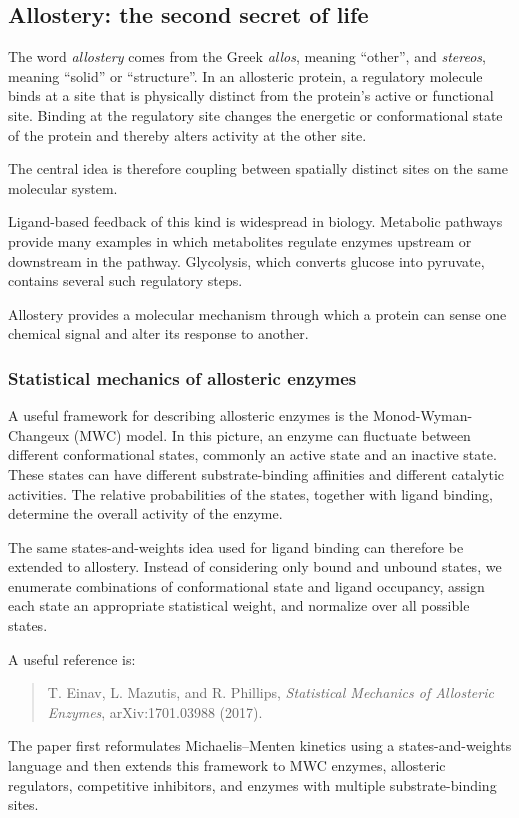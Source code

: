 \subsection{Allostery: the second secret of life}

The word \emph{allostery} comes from the Greek \emph{allos}, meaning ``other'', and \emph{stereos}, meaning ``solid'' or ``structure''.
In an allosteric protein, a regulatory molecule binds at a site that is physically distinct from the protein's active or functional site.
Binding at the regulatory site changes the energetic or conformational state of the protein and thereby alters activity at the other site.

The central idea is therefore coupling between spatially distinct sites on the same molecular system.

Ligand-based feedback of this kind is widespread in biology.
Metabolic pathways provide many examples in which metabolites regulate enzymes upstream or downstream in the pathway.
Glycolysis, which converts glucose into pyruvate, contains several such regulatory steps.

Allostery provides a molecular mechanism through which a protein can sense one chemical signal and alter its response to another.

\subsubsection{Statistical mechanics of allosteric enzymes}

A useful framework for describing allosteric enzymes is the Monod-Wyman-Changeux (MWC) model.
In this picture, an enzyme can fluctuate between different conformational states, commonly an active state and an inactive state.
These states can have different substrate-binding affinities and different catalytic activities.
The relative probabilities of the states, together with ligand binding, determine the overall activity of the enzyme.

The same states-and-weights idea used for ligand binding can therefore be extended to allostery.
Instead of considering only bound and unbound states, we enumerate combinations of conformational state and ligand occupancy, assign each state an appropriate statistical weight, and normalize over all possible states.

A useful reference is:

\begin{quote}
T. Einav, L. Mazutis, and R. Phillips,
\textit{Statistical Mechanics of Allosteric Enzymes},
arXiv:1701.03988 (2017).
\end{quote}

The paper first reformulates Michaelis--Menten kinetics using a states-and-weights language and then extends this framework to MWC enzymes, allosteric regulators, competitive inhibitors, and enzymes with multiple substrate-binding sites.
